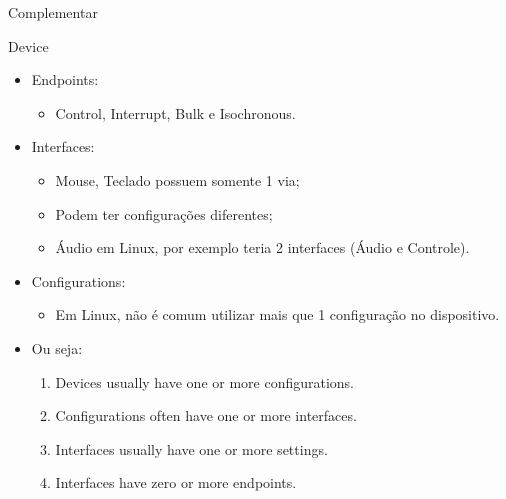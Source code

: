 \begin{frame}{Complementar}
		\begin{block}{Device}
			\begin{itemize}
				\item Endpoints:
				\begin{itemize}
				    \item Control, Interrupt, Bulk e Isochronous.
				\end{itemize}
				\item Interfaces:
				\begin{itemize}
				    \item Mouse, Teclado possuem somente 1 via;
				    \item Podem ter configurações diferentes;
				    \item Áudio em Linux, por exemplo teria 2 interfaces (Áudio e Controle).
				\end{itemize}
				\item Configurations:
				\begin{itemize}
				    \item Em Linux, não é comum utilizar mais que 1 configuração no dispositivo.
				\end{itemize}
				\item Ou seja:
				\begin{enumerate}
				    \item Devices usually have one or more configurations.
				    \item Configurations often have one or more interfaces.
				    \item Interfaces usually have one or more settings.
				    \item Interfaces have zero or more endpoints.
				\end{enumerate}
			\end{itemize}
		\end{block}


		\begin{comment}
		\begin{block}{Compilação e Execução} 
			\begin{itemize}
				\item Deve compilar o código utilizando um compilador fornecido e integrado no Kernel:
				\begin{itemize}
					\item
				\end{itemize}
				\item Após a compilação...:
				\begin{itemize}
					\item
				\end{itemize}
			\end{itemize}
		\end{block}
		\end{comment}
\end{frame}










